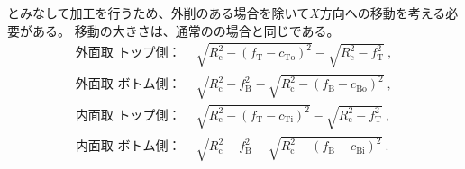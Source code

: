 \clearpage
\EndFaceChamfer とみなして加工を行うため、外削のある場合を除いて$X$方向への移動を考える必要がある。
移動の大きさは、通常の\EndFaceChamfer の場合と同じである。
\begin{align*}
  \text{外面取 トップ側：}&~~
  \sqrt{R_\mathrm c^2-\left(f_\mathrm T-c_\mathrm{To}\right)^2}-\sqrt{R_\mathrm c^2-f_\mathrm T^2}\ ,\\
  \text{外面取 ボトム側：}&~~
  \sqrt{R_\mathrm c^2-f_\mathrm B^2}-\sqrt{R_\mathrm c^2-\left(f_\mathrm B-c_\mathrm{Bo}\right)^2}\ ,\\
  \text{内面取 トップ側：}&~~
  \sqrt{R_\mathrm c^2-\left(f_\mathrm T-c_\mathrm{Ti}\right)^2}-\sqrt{R_\mathrm c^2-f_\mathrm T^2}\ ,\\
  \text{内面取 ボトム側：}&~~
  \sqrt{R_\mathrm c^2-f_\mathrm B^2}-\sqrt{R_\mathrm c^2-\left(f_\mathrm B-c_\mathrm{Bi}\right)^2}\ .
\end{align*}

